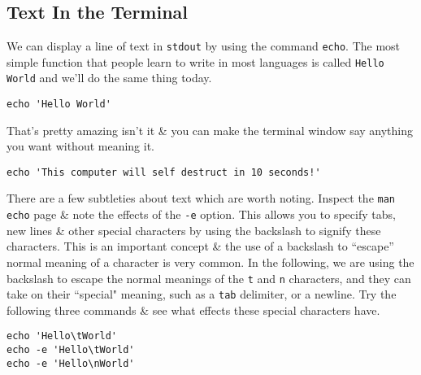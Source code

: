 
\chapter{\moduleTitle}
\newpage

\section{Text In the Terminal}
We can display a line of text in \texttt{stdout} by using the command \texttt{echo}.
The most simple function that people learn to write in most languages is called \texttt{Hello World} and we'll do the same thing today.
\begin{steps}
\begin{lstlisting}
echo 'Hello World'
\end{lstlisting}
\end{steps}
That's pretty amazing isn't it \& you can make the terminal window say anything you want without meaning it.\\
\begin{lstlisting}
echo 'This computer will self destruct in 10 seconds!'
\end{lstlisting}

\begin{information}
There are a few subtleties about text which are worth noting.
Inspect the \texttt{man echo} page \& note the effects of the \texttt{-e} option.
This allows you to specify tabs, new lines \& other special characters by using the backslash to signify these characters.
This is an important concept \& the use of a backslash to ``escape'' normal meaning of a character is very common.
In the following, we are using the backslash to escape the normal meanings of the \texttt{t} and \texttt{n} characters, and they can take on their ``special" meaning, such as a \texttt{tab} delimiter, or a newline.
Try the following three commands \& see what effects these special characters have.
\end{information}
\begin{steps}
\begin{lstlisting}
echo 'Hello\tWorld'
echo -e 'Hello\tWorld'
echo -e 'Hello\nWorld'
\end{lstlisting}
\end{steps}

